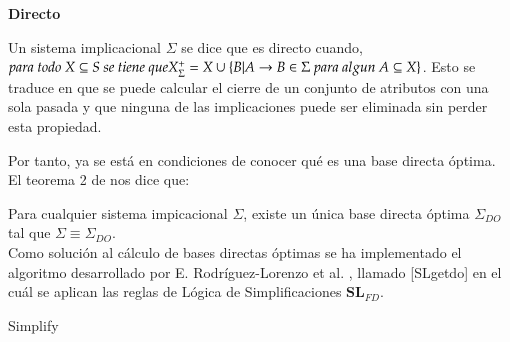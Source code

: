 \textbf{Directo}

Un sistema implicacional \( \Sigma \) se dice que es directo cuando, \( para \ todo \ X \subseteq S \ se \ tiene \ que \\ X^+_{\Sigma} =  X \cup \{ B | A \to B \in \Sigma \ para \ algun \ A \subseteq X \} \). Esto se traduce en que se puede calcular el cierre de un conjunto de atributos con una sola pasada y que ninguna de las implicaciones puede ser eliminada sin perder esta propiedad.

Por tanto, ya se est\'a en condiciones de conocer qu\'e es una base directa \'optima.\\

El teorema 2 de \cite{DO2} nos dice que:

Para cualquier sistema impicacional \(\Sigma\), existe un \'unica base directa \'optima \(\Sigma_{DO}\) tal que \(\Sigma \equiv \Sigma_{DO} \).\\

Como soluci\'on al c\'alculo de bases directas \'optimas se ha implementado el algoritmo desarrollado por  E. Rodr\'iguez-Lorenzo et al. \cite{DO2}, llamado [SLgetdo] en el cu\'al se aplican las reglas de L\'ogica de Simplificaciones \(\textbf{SL}_{FD}\).\\

\IncMargin{1em}
\begin{algorithm}[H]
    \SetAlgoLined
    \DontPrintSemicolon
    \caption{Simplify}\label{alg:4}
\end{algorithm}\DecMargin{1em}

